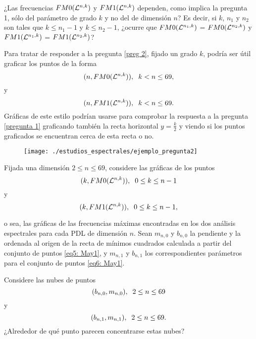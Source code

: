 \begin{pregunta}
\label{preg 2}
¿Las frecuencias 
$FM0(\mathcal{L}^{n,k})$ y $FM1(\mathcal{L}^{n,k})$
dependen, como implica la pregunta 1, sólo del parámetro
de grado $k$ y no del de dimensión $n$?
Es decir, si $k$, $n_{1}$ y $n_{2}$
son tales que $k \leq n_{1}-1$ y
$k \leq n_{2}-1$, ¿ocurre que 
$FM0(\mathcal{L}^{n_{1},k})$ = $FM0(\mathcal{L}^{n_{2},k})$
y 
$FM1(\mathcal{L}^{n_{1},k})$ = $FM1(\mathcal{L}^{n_{2},k})$?
\end{pregunta}

Para tratar de responder a la pregunta \ref{preg 2},
fijado un grado $k$,
podría ser útil graficar los puntos de la forma
\[
(n, FM0(\mathcal{L}^{n,k})), \hspace{0.2cm} k < n \leq 69,
\] y 
\[
(n, FM1(\mathcal{L}^{n,k})), \hspace{0.2cm} k < n \leq 69.
\]
Gráficas de este estilo podrían usarse para comprobar
la respuesta a la pregunta \ref{pregunta 1} 
graficando también la recta horizontal $y = \frac{k}{2}$
y viendo si los puntos graficados se encuentran cerca
de esta recta o no.

\begin{figure}[H]
	\centering
	\texttt{[image: ./estudios\_espectrales/ejemplo\_pregunta2]} 
\end{figure}	

\begin{pregunta}
\label{preg 3}
Fijada una dimensión $2 \leq n \leq 69$,
considere las gráficas de los
puntos 
\begin{equation}
\label{eq5: May1}
(k, FM0(\mathcal{L}^{n,k})), \hspace{0.2cm} 0 \leq k \leq n-1
\end{equation}
y
\begin{equation}
\label{eq6: May1}
(k, FM1(\mathcal{L}^{n,k})), \hspace{0.2cm} 0 \leq k \leq n-1,
\end{equation}

\noindent
o sea, las gráficas de las frecuencias máximas encontradas
en los dos análisis espectrales para cada
PDL de dimensión $n$.
Sean $m_{n,0}$ y $b_{n,0}$ la pendiente y la ordenada
al origen de la recta de mínimos cuadrados calculada a 
partir del conjunto de puntos 
\eqref{eq5: May1}, y
$m_{n,1}$ y $b_{n,1}$ los correspondientes parámetros
para el conjunto de puntos 
\eqref{eq6: May1}.

Considere las nubes de puntos 
\[
(b_{n,0}, m_{n,0}), \hspace{0.2cm} 2 \leq n \leq 69
\]
y 
\[
(b_{n,1}, m_{n,1}), \hspace{0.2cm} 2 \leq n \leq 69.
\]
¿Alrededor de qué punto parecen concentrarse estas nubes?
\end{pregunta}


